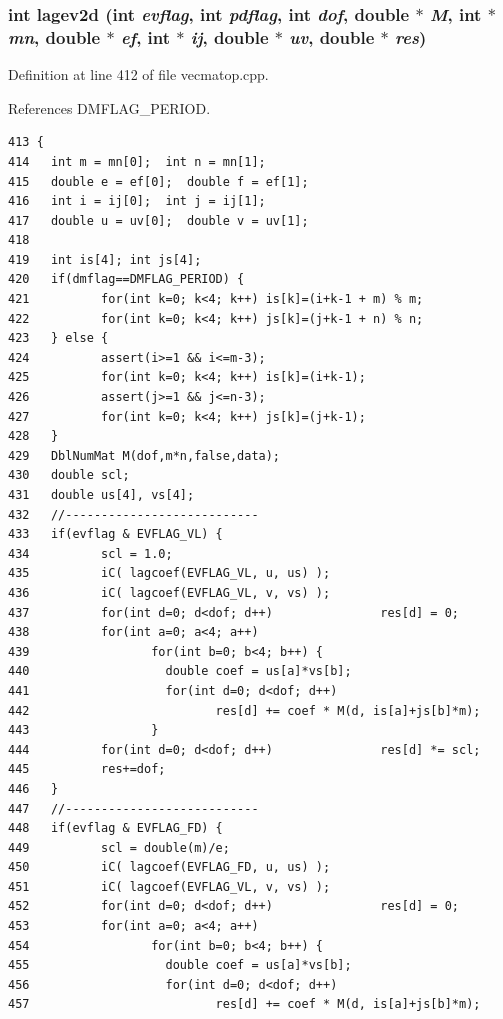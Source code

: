 \subsubsection{\setlength{\rightskip}{0pt plus 5cm}int lagev2d (int {\em evflag}, int {\em pdflag}, int {\em dof}, double $\ast$ {\em M}, int $\ast$ {\em mn}, double $\ast$ {\em ef}, int $\ast$ {\em ij}, double $\ast$ {\em uv}, double $\ast$ {\em res})}\label{vecmatop_8hpp_5777432f838d73947c2307cc63592160_5777432f838d73947c2307cc63592160}




Definition at line 412 of file vecmatop.cpp.

References DMFLAG\_\-PERIOD.

\footnotesize\begin{verbatim}413 {
414   int m = mn[0];  int n = mn[1];
415   double e = ef[0];  double f = ef[1];
416   int i = ij[0];  int j = ij[1];
417   double u = uv[0];  double v = uv[1];
418   
419   int is[4]; int js[4];
420   if(dmflag==DMFLAG_PERIOD) {
421          for(int k=0; k<4; k++) is[k]=(i+k-1 + m) % m;
422          for(int k=0; k<4; k++) js[k]=(j+k-1 + n) % n;
423   } else {
424          assert(i>=1 && i<=m-3);
425          for(int k=0; k<4; k++) is[k]=(i+k-1);
426          assert(j>=1 && j<=n-3);
427          for(int k=0; k<4; k++) js[k]=(j+k-1);
428   }
429   DblNumMat M(dof,m*n,false,data);
430   double scl; 
431   double us[4], vs[4];
432   //---------------------------
433   if(evflag & EVFLAG_VL) {
434          scl = 1.0;
435          iC( lagcoef(EVFLAG_VL, u, us) );
436          iC( lagcoef(EVFLAG_VL, v, vs) );
437          for(int d=0; d<dof; d++)               res[d] = 0;
438          for(int a=0; a<4; a++)
439                 for(int b=0; b<4; b++) {
440                   double coef = us[a]*vs[b]; 
441                   for(int d=0; d<dof; d++)
442                          res[d] += coef * M(d, is[a]+js[b]*m);
443                 }
444          for(int d=0; d<dof; d++)               res[d] *= scl;
445          res+=dof;
446   }
447   //---------------------------
448   if(evflag & EVFLAG_FD) {
449          scl = double(m)/e;
450          iC( lagcoef(EVFLAG_FD, u, us) );
451          iC( lagcoef(EVFLAG_VL, v, vs) );
452          for(int d=0; d<dof; d++)               res[d] = 0;
453          for(int a=0; a<4; a++)
454                 for(int b=0; b<4; b++) {
455                   double coef = us[a]*vs[b];
456                   for(int d=0; d<dof; d++)
457                          res[d] += coef * M(d, is[a]+js[b]*m);

\end{verbatim}
